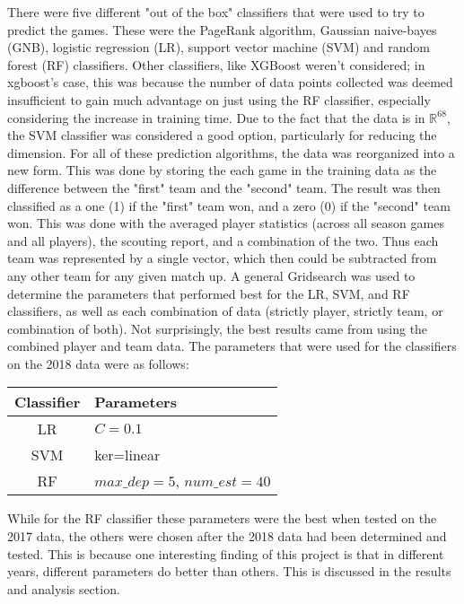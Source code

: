 There were five different "out of the box" classifiers that were used to try to predict the games.  
These were the PageRank algorithm, Gaussian naive-bayes (GNB), logistic regression (LR), support vector machine (SVM) and random forest (RF) classifiers.  
Other classifiers, like XGBoost weren't considered; in xgboost's case, this was because the number of data points collected was deemed insufficient to gain much advantage on just using the RF classifier, especially considering the increase in training time.  
Due to the fact that the data is in $\mathbb{R}^{68}$, the SVM classifier was considered a good option, particularly for reducing the dimension.  
For all of these prediction algorithms, the data was reorganized into a new form.  
This was done by storing the each game in the training data as the difference between the "first" team and the "second" team.  
The result was then classified as a one (1) if the "first" team won, and a zero (0) if the "second" team won.  
This was done with the averaged player statistics (across all season games and all players), the scouting report, and a combination of the two.  
Thus each team was represented by a single vector, which then could be subtracted from any other team for any given match up.  
A general Gridsearch was used to determine the parameters that performed best for the LR, SVM, and RF classifiers, as well as each combination of data (strictly player, strictly team, or combination of both).  
Not surprisingly, the best results came from using the combined player and team data.  
The parameters that were used for the classifiers on the 2018 data were as follows: \newline\newline
\begin{tabular}{|c|l|}
\hline
Classifier & Parameters \\
\hline
LR & $C=0.1$ \\
SVM & ker=linear \\
RF & $max\_dep=5$, $num\_est=40$ \\
\hline
\end{tabular} \newline\newline
While for the RF classifier these parameters were the best when tested on the 2017 data, the others were chosen after the 2018 data had been determined and tested.  
This is because one interesting finding of this project is that in different years, different parameters do better than others.  
This is discussed in the results and analysis section.